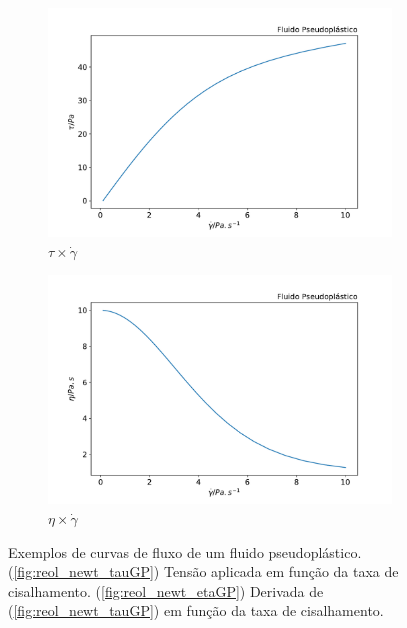 			\begin{figure}[h]
				\begin{subfigure}[t]{.5\textwidth}
					\includegraphics[width=\textwidth]{./imagens/reologia/pseudoplastico_tau}
					\caption{\(\tau \times \dot{\gamma}\)}
					\label{fig:reol_pseudo_tauGP}
				\end{subfigure}%
				\begin{subfigure}[t]{.5\textwidth}
					\includegraphics[width=\textwidth]{./imagens/reologia/pseudoplastico_eta}
					\caption{\(\eta \times \dot{\gamma}\)}
					\label{fig:reol_pseudo_etaGP}
				\end{subfigure}
				\caption{Exemplos de curvas de fluxo de um fluido pseudoplástico. (\ref{fig:reol_newt_tauGP}) Tensão aplicada em função da taxa de cisalhamento. (\ref{fig:reol_newt_etaGP}) Derivada de (\ref{fig:reol_newt_tauGP}) em função da taxa de cisalhamento.}
				\label{fig:reol_pseudoplastico_exemplos}
			\end{figure} 
			
